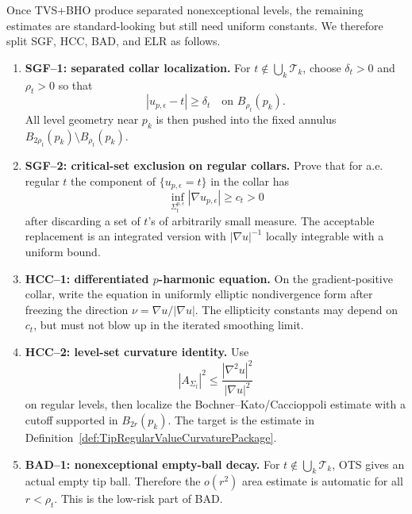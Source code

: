 \begin{remark}
\label{rem:TipNeckCurvatureExceptionalRoadmap}
Once TVS+BHO produce separated nonexceptional levels, the remaining estimates
are standard-looking but still need uniform constants.  We therefore split
SGF, HCC, BAD, and ELR as follows.
\begin{enumerate}
    \item \textbf{SGF--1: separated collar localization.}
    For \(t\notin\bigcup_k\mathcal T_k\), choose \(\delta_t>0\) and
    \(\rho_t>0\) so that
    \[
        |u_{p,\epsilon}-t|\ge\delta_t
        \quad\text{on }B_{\rho_t}(p_k).
    \]
    All level geometry near \(p_k\) is then pushed into the fixed annulus
    \(B_{2\rho_t}(p_k)\setminus B_{\rho_t}(p_k)\).

    \item \textbf{SGF--2: critical-set exclusion on regular collars.}
    Prove that for a.e. regular \(t\) the component of
    \(\{u_{p,\epsilon}=t\}\) in the collar has
    \[
        \inf_{\Sigma_t^{p,\epsilon}}|\nabla u_{p,\epsilon}|
        \ge c_t>0
    \]
    after discarding a set of \(t\)'s of arbitrarily small measure.  The
    acceptable replacement is an integrated version with
    \(|\nabla u|^{-1}\) locally integrable with a uniform bound.

    \item \textbf{HCC--1: differentiated \(p\)-harmonic equation.}
    On the gradient-positive collar, write the equation in uniformly elliptic
    nondivergence form after freezing the direction
    \(\nu=\nabla u/|\nabla u|\).  The ellipticity constants may depend on
    \(c_t\), but must not blow up in the iterated smoothing limit.

    \item \textbf{HCC--2: level-set curvature identity.}
    Use
    \[
        |A_{\Sigma_t}|^2
        \le
        \frac{|\nabla^2u|^2}{|\nabla u|^2}
    \]
    on regular levels, then localize the Bochner--Kato/Caccioppoli estimate
    with a cutoff supported in \(B_{2r}(p_k)\).  The target is the estimate in
    Definition~\ref{def:TipRegularValueCurvaturePackage}.

    \item \textbf{BAD--1: nonexceptional empty-ball decay.}
    For \(t\notin\bigcup_k\mathcal T_k\), OTS gives an actual empty tip ball.
    Therefore the \(o(r^2)\) area estimate is automatic for all
    \(r<\rho_t\).  This is the low-risk part of BAD.


\end{enumerate}
\end{remark}
